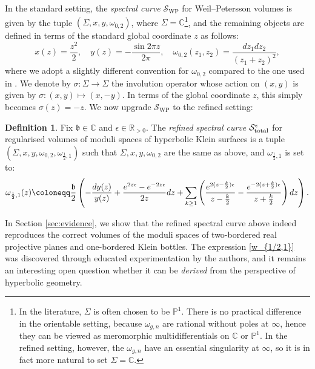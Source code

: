 \documentclass[12pt]{amsart}
\theoremstyle{plain}
\theoremstyle{definition}
\newtheorem{definition}[theorem]{Definition}
\theoremstyle{remark}
\numberwithin{equation}{section}
\begin{document}
In the standard setting, the \emph{spectral curve} $\mathcal{S}_{\text{WP}}$ for Weil--Petersson volumes is given by the tuple $(\Sigma,x,y,\omega_{0,2})$, where $\Sigma=\mathbb{C}$\footnote{In the literature, $\Sigma$ is often chosen to be $\mathbb{P}^1$. There is no practical difference in the orientable setting, because $\omega_{g,n}$ are rational without poles at $\infty$, hence they can be viewed as meromorphic multidifferentials on $\mathbb{C}$ or $\mathbb{P}^1$. In the refined setting, however, the $\omega_{g,n}$ have an essential singularity at $\infty$, so it is in fact more natural to set $\Sigma=\mathbb{C}$.}, and the remaining objects are defined in terms of the standard global coordinate $z$ as follows:
\begin{equation}
x(z)=\frac{z^2}{2},\quad y(z)=-\frac{\sin2\pi z}{2\pi},\quad\omega_{0,2}(z_1,z_2)=\frac{dz_1dz_2}{(z_1+z_2)^2},
\end{equation}
where we adopt a slightly different convention for $\omega_{0,2}$ compared to the one used in \cite{EO08}. We denote by $\sigma:\Sigma\to\Sigma$ the involution operator whose action on $(x,y)$ is given by $\sigma:(x,y)\mapsto(x,-y)$. In terms of the global coordinate $z$, this simply becomes $\sigma(z)=-z$. We now upgrade $\mathcal{S}_{\text{WP}}$ to the refined setting:

\begin{definition}\label{def:curve}
Fix $\mathfrak{b}\in\mathbb{C}$ and $\epsilon\in\mathbb{R}_{>0}$. The \emph{refined spectral curve} $\mathcal{S}^{\epsilon}_{\textup{total}}$ for regularised volumes of moduli spaces of hyperbolic Klein surfaces is a tuple $(\Sigma,x,y,\omega_{0,2},\omega_{\frac12,1})$ such that $\Sigma,x,y,\omega_{0,2}$ are the same as above, and $\omega_{\frac12,1}$ is set to:
\begin{equation}
\omega_{\frac12,1}(z)\coloneqq\frac{\mathfrak{b}}{2}\left(-\frac{dy(z)}{y(z)}+\frac{e^{2z\epsilon}-e^{-2z\epsilon}}{2z}dz+\sum_{k\geq1}\left(\frac{e^{2(z-\frac{k}{2})\epsilon}}{z-\frac{k}{2}}-\frac{e^{-2(z+\frac{k}{2})\epsilon}}{z+\frac{k}{2}}\right)dz\right)\label{w_{1/2,1}}.
\end{equation}
\end{definition}

In Section \ref{sec:evidence}, we show that the refined spectral curve above indeed reproduces the correct volumes of the moduli spaces of two-bordered real projective planes and one-bordered Klein bottles. The expression \eqref{w_{1/2,1}} was discovered through educated experimentation by the authors, and it remains an interesting open question whether it can be \emph{derived} from the perspective of hyperbolic geometry.
\end{document}

